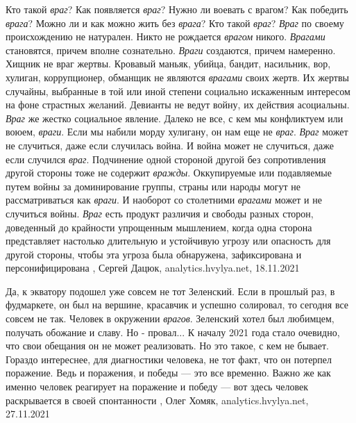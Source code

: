Кто такой \emph{враг}? Как появляется \emph{враг}? Нужно ли воевать с врагом?
Как победить \emph{врага}? Можно ли и как можно жить без \emph{врага}?  Кто
такой \emph{враг}?  \emph{Враг} по своему происхождению не натурален. Никто не
рождается \emph{врагом} никого.  \emph{Врагами} становятся, причем вполне
сознательно. \emph{Враги} создаются, причем намеренно.  Хищник не враг жертвы.
Кровавый маньяк, убийца, бандит, насильник, вор, хулиган, коррупционер,
обманщик не являются \emph{врагами} своих жертв. Их жертвы случайны, выбранные
в той или иной степени социально искаженным интересом на фоне страстных
желаний.  Девианты не ведут войну, их действия асоциальны. \emph{Враг} же
жестко социальное явление.  Далеко не все, с кем мы конфликтуем или воюем,
\emph{враги}. Если мы набили морду хулигану, он нам еще не \emph{враг}.
\emph{Враг} может не случиться, даже если случилась война. И война может не
случиться, даже если случился \emph{враг}.  Подчинение одной стороной другой
без сопротивления другой стороны тоже не содержит \emph{вражды}.  Оккупируемые
или подавляемые путем войны за доминирование группы, страны или народы могут не
рассматриваться как \emph{враги}. И наоборот со столетними \emph{врагами} может
и не случиться войны.  \emph{Враг} есть продукт различия и свободы разных
сторон, доведенный до крайности упрощенным мышлением, когда одна сторона
представляет настолько длительную и устойчивую угрозу или опасность для другой
стороны, чтобы эта угроза была обнаружена, зафиксирована и персонифицирована
, Сергей Дацюк, analytics.hvylya.net, 18.11.2021

Да, к экватору подошел уже совсем не тот Зеленский. Если в прошлый раз, в
фудмаркете, он был на вершине, красавчик и успешно солировал, то сегодня все
совсем не так.  Человек в окружении \emph{врагов}.  Зеленский хотел был
любимцем, получать обожание и славу. Но - провал... К началу 2021 года стало
очевидно, что свои обещания он не может реализовать. Но это такое, с кем не
бывает. Гораздо интереснее, для диагностики человека, не тот факт, что он
потерпел поражение. Ведь и поражения, и победы — это все временно.  Важно же
как именно человек реагирует на поражение и победу — вот здесь человек
раскрывается в своей спонтанности
, 
Олег Хомяк, analytics.hvylya.net, 27.11.2021
